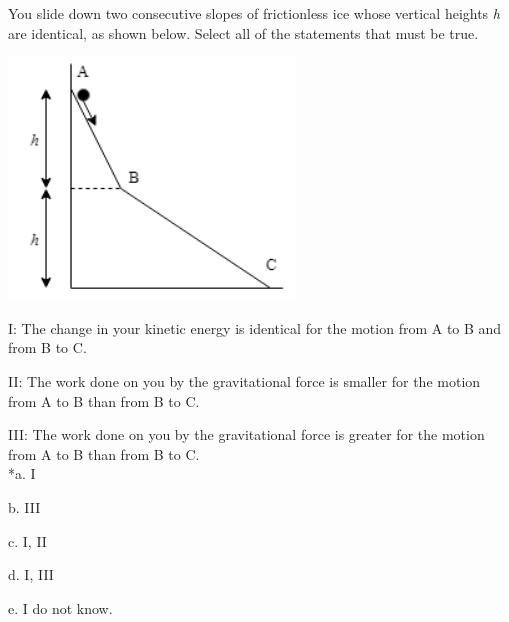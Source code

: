 
You slide down two consecutive slopes of frictionless ice whose vertical heights \textit{h} are identical, as shown below. Select all of the statements that must be true.

\includegraphics[width=3in]{../../Images/WorkAndEnergyQ6.png}

I: The change in your kinetic energy is identical for the motion from A to B and from B to C.

II: The work done on you by the gravitational force is smaller for the motion from A to B than from B to C.

III: The work done on you by the gravitational force is greater for the motion from A to B than from B to C. \\

*a. I

b. III

c. I, II

d. I, III

e. I do not know. \\
